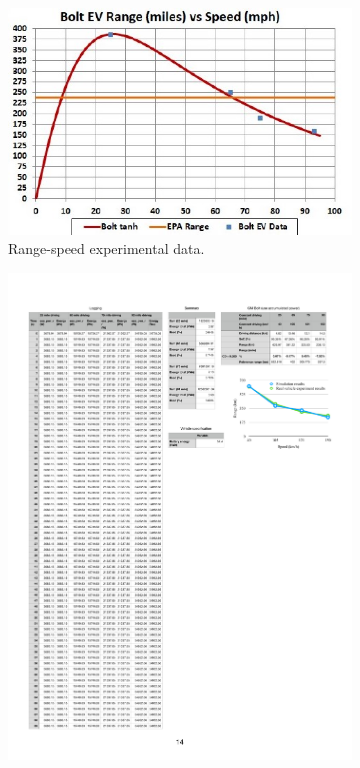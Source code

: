 \documentclass[onecolumn]{IEEEconf}
\begin{document}
\begin{description}
\begin{figure} [h!]  %
 \renewcommand\thefigure{2}
\centering
	\begin{subfigure}{0.47\textwidth}
	\includegraphics[width=\hsize]{Figures/Bolt_EV_range.jpg}
	\caption{Range-speed experimental data.}
	\label{fig:range_speed_exp}
	\end{subfigure}
	\begin{subfigure}{0.47\textwidth}
	\includegraphics[width=\hsize]{Figures/Range-speed_validation.pdf}

\end{subfigure}
\end{figure}
\end{description}
\end{document}
